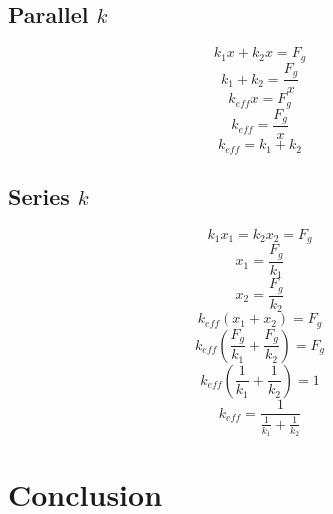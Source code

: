 \documentclass{article}
\begin{document}
\subsection{Parallel $k$}
\[k_1x + k_2x = F_g\]
\[k_1 + k_2 = \frac{F_g}{x}\]
\[k_{eff}x = F_g\]
\[k_{eff} = \frac{F_g}{x}\]
\[k_{eff} = k_1 + k_2\]
\subsection{Series $k$}
\[k_1x_1 = k_2x_2 = F_g\]
\[x_1 = \frac{F_g}{k_1}\]
\[x_2 = \frac{F_g}{k_2}\]
\[k_{eff}(x_1 + x_2) = F_g\]
\[k_{eff}(\frac{F_g}{k_1} + \frac{F_g}{k_2}) = F_g\]
\[k_{eff}(\frac{1}{k_1} + \frac{1}{k_2}) = 1\]
\[k_{eff} = \frac{1}{\frac{1}{k_1} + \frac{1}{k_2}}\]
\section{Conclusion}
\end{document}

